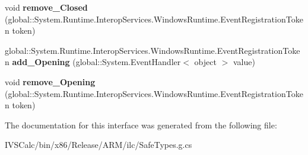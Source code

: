 \begin{DoxyCompactItemize}
void {\bfseries remove\+\_\+\+Closed} (global\+::\+System.\+Runtime.\+Interop\+Services.\+Windows\+Runtime.\+Event\+Registration\+Token token)
\item 
\mbox{\label{interface_windows_1_1_u_i_1_1_xaml_1_1_controls_1_1_primitives_1_1_i_flyout_base_a2d94b89f80d0c8f635b98b2c6886a573}} 
global\+::\+System.\+Runtime.\+Interop\+Services.\+Windows\+Runtime.\+Event\+Registration\+Token {\bfseries add\+\_\+\+Opening} (global\+::\+System.\+Event\+Handler$<$ object $>$ value)
\item 
\mbox{\label{interface_windows_1_1_u_i_1_1_xaml_1_1_controls_1_1_primitives_1_1_i_flyout_base_acf6768490edf1a9db765685184ebccf0}} 
void {\bfseries remove\+\_\+\+Opening} (global\+::\+System.\+Runtime.\+Interop\+Services.\+Windows\+Runtime.\+Event\+Registration\+Token token)
\end{DoxyCompactItemize}


The documentation for this interface was generated from the following file\+:\begin{DoxyCompactItemize}
\item 
I\+V\+S\+Calc/bin/x86/\+Release/\+A\+R\+M/ilc/Safe\+Types.\+g.\+cs\end{DoxyCompactItemize}
